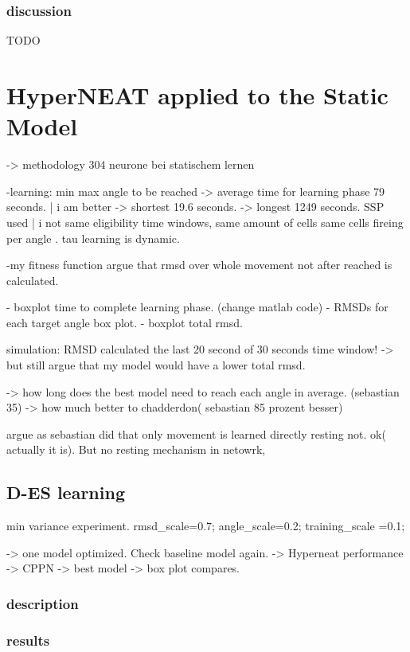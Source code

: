 \subsubsection{discussion}
TODO
\section{HyperNEAT applied to the Static Model}
-> methodology 304 neurone bei statischem lernen

-learning: min max angle to be reached
-> average time for learning phase 79 seconds.  | i am better
-> shortest 19.6 seconds.
-> longest 1249 seconds.
SSP used | i not
same eligibility time windows,
same amount of cells
same cells fireing per angle .
tau learning is dynamic.

-my fitness function
	argue that rmsd over whole movement not after reached is calculated.
	
- boxplot time to complete learning phase. (change matlab code)
- RMSDs for each target angle box plot.
- boxplot total rmsd.

simulation:
RMSD calculated the last 20 second of 30 seconds time window!
-> but still argue that my model would have a lower total rmsd.
 
 -> how long does the best model need to reach each angle in average. (sebastian 35)
     -> how much better to chadderdon( sebastian 85 prozent besser)
     
 argue as sebastian did that only movement is learned directly resting not. ok( actually it is). But no resting mechanism in netowrk,


\subsection{D-ES learning}
min variance experiment. 
            rmsd_scale=0.7;
angle_scale=0.2;
training_scale =0.1;


-> one model optimized. Check baseline model again.
-> Hyperneat performance
-> CPPN
-> best model
-> box plot compares.


\subsubsection{description}
\subsubsection{results}
